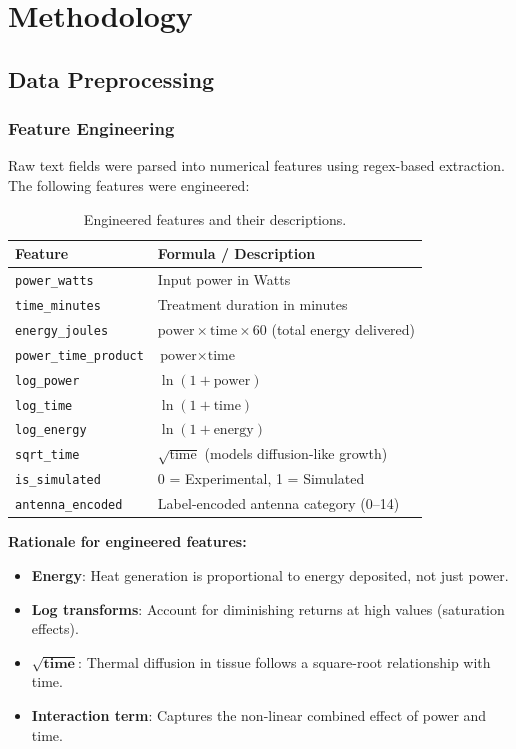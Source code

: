 \chapter{Methodology}

\section{Data Preprocessing}

\subsection{Feature Engineering}

Raw text fields were parsed into numerical features using regex-based extraction. The following features were engineered:

\begin{table}[H]
\centering
\caption{Engineered features and their descriptions.}
\label{tab:features}
\begin{tabular}{ll}
\toprule
\textbf{Feature} & \textbf{Formula / Description} \\
\midrule
\texttt{power\_watts}         & Input power in Watts \\
\texttt{time\_minutes}        & Treatment duration in minutes \\
\texttt{energy\_joules}       & $\text{power} \times \text{time} \times 60$ (total energy delivered) \\
\texttt{power\_time\_product} & $\text{power} \times \text{time}$ \\
\texttt{log\_power}           & $\ln(1 + \text{power})$ \\
\texttt{log\_time}            & $\ln(1 + \text{time})$ \\
\texttt{log\_energy}          & $\ln(1 + \text{energy})$ \\
\texttt{sqrt\_time}           & $\sqrt{\text{time}}$ (models diffusion-like growth) \\
\texttt{is\_simulated}        & 0 = Experimental, 1 = Simulated \\
\texttt{antenna\_encoded}     & Label-encoded antenna category (0--14) \\
\bottomrule
\end{tabular}
\end{table}

\noindent\textbf{Rationale for engineered features:}
\begin{itemize}
    \item \textbf{Energy}: Heat generation is proportional to energy deposited, not just power.
    \item \textbf{Log transforms}: Account for diminishing returns at high values (saturation effects).
    \item $\boldsymbol{\sqrt{\text{time}}}$: Thermal diffusion in tissue follows a square-root relationship with time.
    \item \textbf{Interaction term}: Captures the non-linear combined effect of power and time.
\end{itemize}


